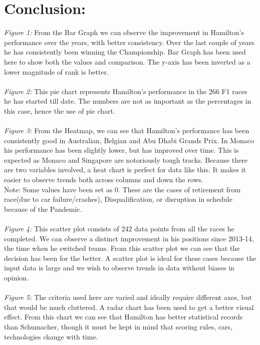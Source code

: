 \documentclass{article}
\begin{document}
\section{Conclusion:}
\textit{Figure 1:}  From the Bar Graph we can observe the improvement in Hamilton's performance over the years, with better consistency. Over the last couple of years he has consistently been winning the Championship. Bar Graph has been used here to show both the values and comparison. The y-axis has been inverted as a lower magnitude of rank is better.\\\\
\textit{Figure 2:} This pie chart represents Hamilton's performance in the 266 F1 races he has started till date. The numbers are not as important as the percentages in this case, hence the use of pie chart.\\\\
\textit{Figure 3:} From the Heatmap, we can see that Hamilton's performance has been consistently good in Australian, Belgian and Abu Dhabi Grands Prix. In Monaco his performance has been slightly lower, but has improved over time. This is expected as Monaco and Singapore are notoriously tough tracks. Because there are two variables involved, a heat chart is perfect for data like this. It makes it easier to observe trends both across columns and down the rows.\\ Note: Some values have been set as 0. These are the cases of retirement from race(due to car failure/crashes), Disqualification, or disruption in schedule because of the Pandemic.\\\\
\textit{Figure 4:} This scatter plot consists of 242 data points from all the races he completed. We can observe a distinct improvement in his positions since 2013-14, the time when he switched teams. From this scatter plot we can see that the decision has been for the better. A scatter plot is ideal for these cases because the input data is large and we wish to observe trends in data without biases in opinion.\\\\
\textit{Figure 5:} The criteria used here are varied and ideally require different axes, but that would be much cluttered. A radar chart has been used to get a better visual effect. From this chart we can see that Hamilton has better statistical records than Schumacher, though it must be kept in mind that scoring rules, cars, technologies change with time.\\\\
\end{document}
